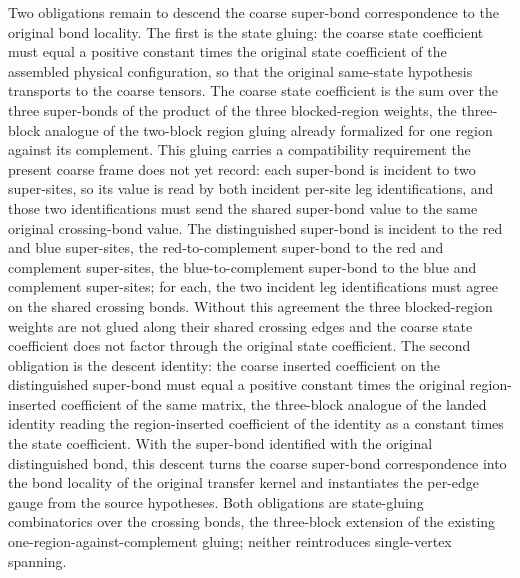\documentclass{article}
\begin{document}
\begin{enumerate}
          Two obligations remain to descend the coarse super-bond correspondence to the
          original bond locality. The first is the state gluing: the coarse state
          coefficient must equal a positive constant times the original state
          coefficient of the assembled physical configuration, so that the original
          same-state hypothesis transports to the coarse tensors. The coarse state
          coefficient is the sum over the three super-bonds of the product of the three
          blocked-region weights, the three-block analogue of the two-block region
          gluing already formalized for one region against its complement. This gluing
          carries a compatibility requirement the present coarse frame does not yet
          record: each super-bond is incident to two super-sites, so its value is read
          by both incident per-site leg identifications, and those two identifications
          must send the shared super-bond value to the same original crossing-bond
          value. The distinguished super-bond is incident to the red and blue
          super-sites, the red-to-complement super-bond to the red and complement
          super-sites, the blue-to-complement super-bond to the blue and complement
          super-sites; for each, the two incident leg identifications must agree on the
          shared crossing bonds. Without this agreement the three blocked-region weights
          are not glued along their shared crossing edges and the coarse state
          coefficient does not factor through the original state coefficient. The second
          obligation is the descent identity: the coarse inserted coefficient on the
          distinguished super-bond must equal a positive constant times the original
          region-inserted coefficient of the same matrix, the three-block analogue of
          the landed identity reading the region-inserted coefficient of the identity as
          a constant times the state coefficient. With the super-bond identified with
          the original distinguished bond, this descent turns the coarse super-bond
          correspondence into the bond locality of the original transfer kernel and
          instantiates the per-edge gauge from the source hypotheses. Both obligations
          are state-gluing combinatorics over the crossing bonds, the three-block
          extension of the existing one-region-against-complement gluing; neither
          reintroduces single-vertex spanning.


\end{enumerate}
\end{document}
